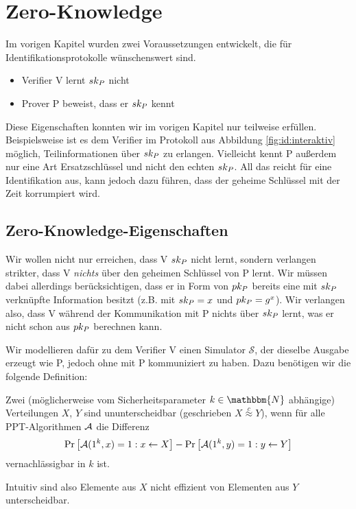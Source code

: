 \chapter{Zero-Knowledge}
Im vorigen Kapitel wurden zwei Voraussetzungen entwickelt, die für
Identifikationsprotokolle wünschenswert sind.
\begin{itemize}
  \item Verifier V lernt $sk_P$ nicht
  \item Prover P beweist, dass er $sk_P$ kennt
\end{itemize}
Diese Eigenschaften konnten wir im vorigen Kapitel nur teilweise
erfüllen. Beispielsweise ist es dem Verifier im Protokoll aus Abbildung
\ref{fig:id:interaktiv} möglich, Teilinformationen über $sk_P$ zu
erlangen. Vielleicht kennt P außerdem nur eine Art Ersatzschlüssel und
nicht den echten $sk_P$. All das reicht für eine Identifikation aus,
kann jedoch dazu führen, dass der geheime Schlüssel mit der Zeit
korrumpiert wird.

\section{Zero-Knowledge-Eigenschaften}
Wir wollen nicht nur erreichen, dass V $sk_P$ nicht lernt, sondern
verlangen strikter, dass V \emph{nichts} über den geheimen Schlüssel von
P lernt. Wir müssen dabei allerdings berücksichtigen, dass er in Form
von $pk_P$ bereits eine mit $sk_P$ verknüpfte Information besitzt
(z.B.  mit $sk_P = x$ und $pk_P = g^x$). Wir verlangen also, dass
V während der Kommunikation mit P nichts über $sk_P$ lernt, was er
nicht schon aus $pk_P$ berechnen kann.

Wir modellieren dafür zu dem Verifier V einen Simulator $\mathcal{S}$,
der dieselbe Ausgabe erzeugt wie P, jedoch ohne mit P kommuniziert zu
haben. Dazu benötigen wir die folgende Definition:
\begin{definition}[Ununterscheidbarkeit]
  \label{def:zk:ununterscheidbarkeit}
  Zwei (möglicherweise vom Sicherheitsparameter $k \in \mathbbm{N}$ abhängige) Verteilungen $X$, $Y$ sind ununterscheidbar (geschrieben $X
  \stackrel{c}\approx Y$), wenn für alle PPT-Algorithmen $\mathcal{A}$ die Differenz
  \[
    \Pr \left[ \mathcal{A}(1^k,x) = 1 : x \leftarrow X \right] - \Pr \left[ \mathcal{A}(1^k, y) = 1 : y \leftarrow Y \right]
  \]
  vernachlässigbar in $k$ ist.
\end{definition}
Intuitiv sind also Elemente aus $X$ nicht effizient von Elementen aus $Y$ unterscheidbar.

